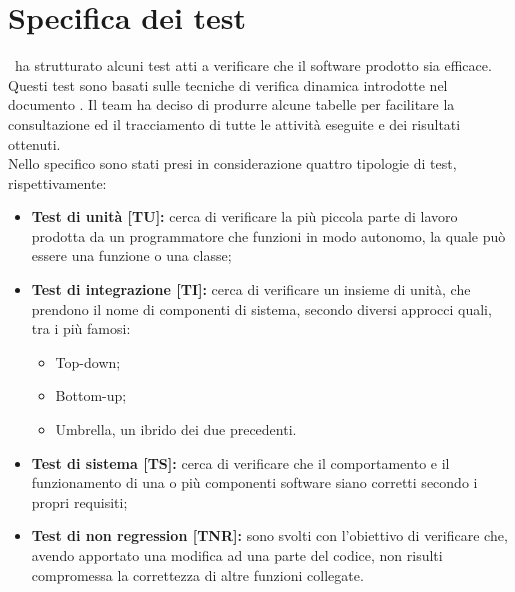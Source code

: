 \documentclass[../PianoDiQualifica_v3.0.0.tex]{subfiles}
\begin{document}
\section{Specifica dei test}
\kpanic\ ha strutturato alcuni test atti a verificare che il software prodotto sia efficace. Questi test sono basati sulle tecniche di verifica dinamica introdotte nel documento \normediprogettov. Il team ha deciso di produrre alcune tabelle per facilitare la consultazione ed il tracciamento di tutte le attività eseguite e dei risultati ottenuti.\\ Nello specifico sono stati presi in considerazione quattro tipologie di test, rispettivamente:
\begin{itemize}
	\item \textbf{Test di unità [TU]:} cerca di verificare la più piccola parte di lavoro prodotta da un programmatore che funzioni in modo autonomo, la quale può essere una funzione o una classe;
	\item \textbf{Test di integrazione [TI]:} cerca di verificare un insieme di unità, che prendono il nome di componenti di sistema, secondo diversi approcci quali, tra i più famosi:
	\begin{itemize}
		\item Top-down;
		\item Bottom-up;
		\item Umbrella, un ibrido dei due precedenti.
	\end{itemize}
	\item \textbf{Test di sistema [TS]:} cerca di verificare che il comportamento e il funzionamento di una o più componenti software siano corretti secondo i propri requisiti;

\begin{comment}
	\item \textbf{Test di validazione [TV]:} chiamato anche test di accettazione, cerca di verificare che il lavoro prodotto soddisfi quanto richiesto dal proponente. Nella pratica, attraverso delle funzioni si cerca di simulare il comportamento generale dell'applicativo e dell'utente che interagisce con esso.
\end{comment}

	\item \textbf{Test di non regression [TNR]:} sono svolti con l’obiettivo di verificare che, avendo apportato una modifica ad una parte del codice, non risulti compromessa la correttezza di altre funzioni collegate.
\end{itemize}
\end{document}
